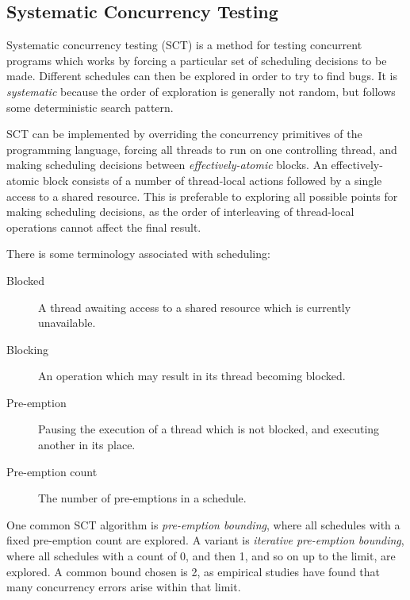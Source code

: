 \subsection*{Systematic Concurrency Testing}
\label{sec:dejafu-impl-sct}

Systematic concurrency testing\cite{empirical} (SCT) is a method for
testing concurrent programs which works by forcing a particular set of
scheduling decisions to be made. Different schedules can then be
explored in order to try to find bugs. It is \textit{systematic}
because the order of exploration is generally not random, but follows
some deterministic search pattern.

SCT can be implemented by overriding the concurrency primitives of the
programming language, forcing all threads to run on one controlling
thread, and making scheduling decisions between
\textit{effectively-atomic} blocks. An effectively-atomic block
consists of a number of thread-local actions followed by a single
access to a shared resource. This is preferable to exploring all
possible points for making scheduling decisions, as the order of
interleaving of thread-local operations cannot affect the final
result.

There is some terminology associated with scheduling:

\begin{description}
  \item[Blocked] A thread awaiting access to a shared resource which is
    currently unavailable.

  \item[Blocking] An operation which may result in its thread becoming
    blocked.

  \item[Pre-emption] Pausing the execution of a thread which is not
    blocked, and executing another in its place.

  \item[Pre-emption count] The number of pre-emptions in a schedule.
\end{description}

One common SCT algorithm is \textit{pre-emption
  bounding}\cite{pbound}, where all schedules with a fixed pre-emption
count are explored. A variant is \textit{iterative pre-emption
  bounding}, where all schedules with a count of 0, and then 1, and so
on up to the limit, are explored. A common bound chosen is 2, as
empirical studies have found that many concurrency errors arise within
that limit\cite{pbound}\cite{empirical}.

